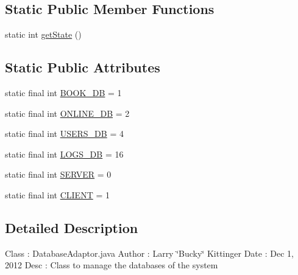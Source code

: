 \subsection*{Static Public Member Functions}
\begin{DoxyCompactItemize}
\item 
static int \hyperlink{classw3se_1_1_model_1_1_database_1_1_database_adaptor_ab21bf99d29106baa4c0001f00088648c}{get\-State} ()
\end{DoxyCompactItemize}
\subsection*{Static Public Attributes}
\begin{DoxyCompactItemize}
\item 
static final int \hyperlink{classw3se_1_1_model_1_1_database_1_1_database_adaptor_ae9a723ec22a2faffd833796f7afeb6ef}{B\-O\-O\-K\-\_\-\-D\-B} = 1
\item 
static final int \hyperlink{classw3se_1_1_model_1_1_database_1_1_database_adaptor_afe4d33dc15d4ac9af43c3c631619a086}{O\-N\-L\-I\-N\-E\-\_\-\-D\-B} = 2
\item 
static final int \hyperlink{classw3se_1_1_model_1_1_database_1_1_database_adaptor_a59eacb7231c850d9ac675ea99b3f4bfd}{U\-S\-E\-R\-S\-\_\-\-D\-B} = 4
\item 
static final int \hyperlink{classw3se_1_1_model_1_1_database_1_1_database_adaptor_a39191eb3e12600bd39ded42ed4ef2707}{L\-O\-G\-S\-\_\-\-D\-B} = 16
\item 
static final int \hyperlink{classw3se_1_1_model_1_1_database_1_1_database_adaptor_a7fad4326381f42f0e38484a0e07d7ff3}{S\-E\-R\-V\-E\-R} = 0
\item 
static final int \hyperlink{classw3se_1_1_model_1_1_database_1_1_database_adaptor_a2c5a2b62c46dcf90c0585fa6bb721d01}{C\-L\-I\-E\-N\-T} = 1
\end{DoxyCompactItemize}


\subsection{Detailed Description}
Class \-: Database\-Adaptor.\-java Author \-: Larry \char`\"{}\-Bucky\char`\"{} Kittinger Date \-: Dec 1, 2012 Desc \-: Class to manage the databases of the system 

